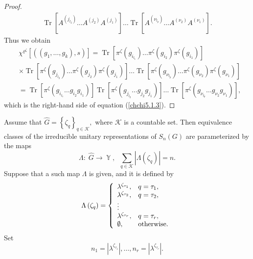 \documentclass[12pt]{amsart}
\theoremstyle{definition}
\numberwithin{equation}{section}
\DeclareMathOperator{\Tr}{Tr}
\DeclareMathOperator{\Y}{\mathbb{Y}}
\begin{document}
\begin{proof}
\begin{equation}
\begin{split}
\Tr\left[A^{(j_{l_2})}\ldots A^{(j_2)} A^{(j_1)}\right]\ldots
\Tr\left[A^{(\nu_{l_p})}\ldots A^{(\nu_2)} A^{(\nu_1)}\right].
\end{split}
\end{equation}
Thus we obtain
\begin{equation}
\begin{split}
&\chi^{\varrho^{\zeta}}\left[\left(\left(g_1,\ldots,g_k\right),s\right)\right]=\Tr\left[\pi^{\zeta}\left(g_{i_{l_1}}\right)
\ldots \pi^{\zeta}\left(g_{i_{2}}\right)\pi^{\zeta}\left(g_{i_{1}}\right)\right]
\\
&\times\Tr\left[\pi^{\zeta}\left(g_{j_{l_2}}\right)
\ldots \pi^{\zeta}\left(g_{j_{2}}\right)\pi^{\zeta}\left(g_{j_{1}}\right)\right]
\ldots
\Tr\left[\pi^{\zeta}\left(g_{\nu_{l_p}}\right)
\ldots \pi^{\zeta}\left(g_{\nu_{2}}\right)\pi^{\zeta}\left(g_{\nu_{1}}\right)\right]\\
&=\Tr\left[\pi^{\zeta}\left(g_{i_{l_1}}
\ldots g_{i_{2}}g_{i_{1}}\right)\right]
\Tr\left[\pi^{\zeta}\left(g_{j_{l_2}}
\ldots g_{j_{2}}g_{j_{1}}\right)\right]
\ldots
\Tr\left[\pi^{\zeta}\left(g_{\nu_{l_p}}
\ldots g_{\nu_{2}}g_{\nu_{1}}\right)\right],
\end{split}
\end{equation}
which is the right-hand side of equation (\ref{chchi5.1.3}).
\end{proof}
Assume that
$
\widehat{G}=\left\{\zeta_q\right\}_{q\in\mathcal{K}},
$
where $\mathcal{K}$ is a countable set. Then equivalence classes of the irreducible unitary representations of $S_n(G)$ are parameterized by the maps
\begin{equation}\label{chchi5.2.1}
\Lambda:\;\widehat{G}\longrightarrow\Y,\;\;
\sum\limits_{q\in\mathcal{K}}|\Lambda(\zeta_q)|=n.
\end{equation}
Suppose that a such map  $\Lambda$ is given, and it is defined by
\begin{equation}\label{chchi5.2.2}
\Lambda\left(\zeta_q\right)=
\left\{
  \begin{array}{ll}
    \lambda^{\zeta_{\tau_1}}, & q=\tau_1, \\
    \lambda^{\zeta_{\tau_2}}, & q=\tau_2, \\
    \vdots &  \\
    \lambda^{\zeta_{\tau_r}}, & q=\tau_r, \\
    \emptyset, & \hbox{otherwise.}
  \end{array}
\right.
\end{equation}
Set
$$
n_1=|\lambda^{\zeta_{\tau_1}}|,\ldots, n_r=|\lambda^{\zeta_{\tau_r}}|.
$$
\end{document}
